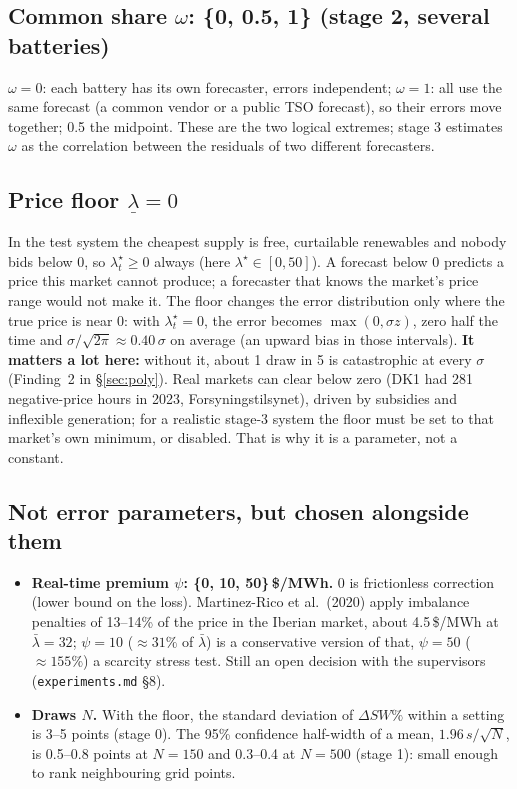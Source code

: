 \documentclass[10pt,a4paper]{article}
\newcommand{\code}[1]{\texttt{#1}}
\newcommand{\lamstar}{\lambda^{\star}}
\begin{document}
\subsection{Common share $\omega$: \{0, 0.5, 1\} (stage 2, several batteries)}
$\omega=0$: each battery has its own forecaster, errors independent; $\omega=1$: all use the same forecast
(a common vendor or a public TSO forecast), so their errors move together; 0.5 the midpoint. These are the
two logical extremes; stage 3 estimates $\omega$ as the correlation between the residuals of two different
forecasters.

\subsection{Price floor $\underline\lambda=0$}
In the test system the cheapest supply is free, curtailable renewables and nobody bids below 0, so
$\lamstar_t\ge0$ always (here $\lamstar\in[0,50]$). A forecast below 0 predicts a price this market cannot
produce; a forecaster that knows the market's price range would not make it. The floor changes the error
distribution only where the true price is near 0: with $\lamstar_t=0$, the error becomes $\max(0,\sigma z)$,
zero half the time and $\sigma/\sqrt{2\pi}\approx0.40\,\sigma$ on average (an upward bias in those
intervals). \textbf{It matters a lot here:} without it, about 1 draw in 5 is catastrophic at every
$\sigma$ (Finding~2 in \S\ref{sec:poly}). Real markets can clear below zero (DK1 had 281 negative-price hours in 2023,
Forsyningstilsynet), driven by subsidies and inflexible generation; for a realistic stage-3 system the floor
must be set to that market's own minimum, or disabled. That is why it is a parameter, not a constant.

\subsection{Not error parameters, but chosen alongside them}
\begin{itemize}
  \item \textbf{Real-time premium $\psi$: \{0, 10, 50\}\,\$/MWh.} 0 is frictionless correction (lower bound on
    the loss). Martinez-Rico et al.\ (2020) apply imbalance penalties of 13--14\% of the price in the Iberian
    market, about 4.5\,\$/MWh at $\bar\lambda=32$; $\psi=10$ ($\approx31\%$ of $\bar\lambda$) is a conservative
    version of that, $\psi=50$ ($\approx155\%$) a scarcity stress test. Still an open decision with the
    supervisors (\code{experiments.md} \S8).
  \item \textbf{Draws $N$.} With the floor, the standard deviation of $\Delta SW\%$ within a setting is 3--5
    points (stage 0). The 95\% confidence half-width of a mean, $1.96\,s/\sqrt N$, is 0.5--0.8 points at
    $N=150$ and 0.3--0.4 at $N=500$ (stage 1): small enough to rank neighbouring grid points.
\end{itemize}
\end{document}
